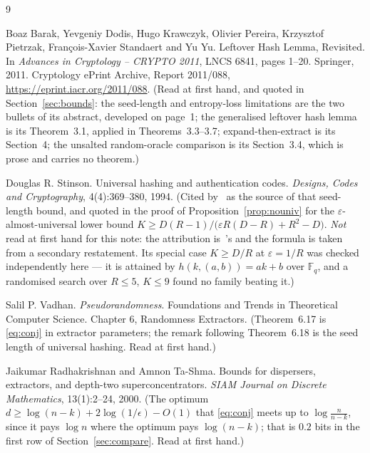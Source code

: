 \documentclass{aicr-solution}
\begin{document}
\begin{aicrbibliography}{9}

Boaz Barak, Yevgeniy Dodis, Hugo Krawczyk, Olivier Pereira, Krzysztof Pietrzak,
Fran\c{c}ois-Xavier Standaert and Yu Yu.
\newblock Leftover Hash Lemma, Revisited.
\newblock In \emph{Advances in Cryptology -- CRYPTO 2011}, LNCS 6841, pages 1--20. Springer, 2011.
\newblock Cryptology ePrint Archive, Report 2011/088, \url{https://eprint.iacr.org/2011/088}.
\newblock (Read at first hand, and quoted in Section~\ref{sec:bounds}: the seed-length and
entropy-loss limitations are the two bullets of its abstract, developed on page~1; the generalised
leftover hash lemma is its Theorem~3.1, applied in Theorems~3.3--3.7; expand-then-extract is its
Section~4; the unsalted random-oracle comparison is its Section~3.4, which is prose and carries no
theorem.)

Douglas R. Stinson.
\newblock Universal hashing and authentication codes.
\newblock \emph{Designs, Codes and Cryptography}, 4(4):369--380, 1994.
\newblock (Cited by~\cite{BDKPPSY11} as the source of that seed-length bound, and quoted in the
proof of Proposition~\ref{prop:nouniv} for the $\varepsilon$-almost-universal lower bound
$K \ge D(R-1)/\bigl(\varepsilon R(D-R) + R^{2} - D\bigr)$. \emph{Not} read at first hand for this
note: the attribution is~\cite{BDKPPSY11}'s and the formula is taken from a secondary restatement.
Its special case $K \ge D/R$ at $\varepsilon = 1/R$ was checked independently here --- it is
attained by $h(k,(a,b)) = ak+b$ over $\mathbb{F}_q$, and a randomised search over $R \le 5$,
$K \le 9$ found no family beating it.)

Salil P. Vadhan.
\newblock \emph{Pseudorandomness}.
\newblock Foundations and Trends in Theoretical Computer Science. Chapter 6, Randomness Extractors.
\newblock (Theorem~6.17 is \eqref{eq:conj} in extractor parameters; the remark following
Theorem~6.18 is the seed length of universal hashing. Read at first hand.)

Jaikumar Radhakrishnan and Amnon Ta-Shma.
\newblock Bounds for dispersers, extractors, and depth-two superconcentrators.
\newblock \emph{SIAM Journal on Discrete Mathematics}, 13(1):2--24, 2000.
\newblock (The optimum $d \ge \log(n-k) + 2\log(1/\epsilon) - O(1)$ that \eqref{eq:conj} meets up
to $\log\frac{n}{n-k}$, since it pays $\log n$ where the optimum pays $\log(n-k)$; that is $0.2$
bits in the first row of Section~\ref{sec:compare}.
Read at first hand.)

\end{aicrbibliography}
\end{document}
